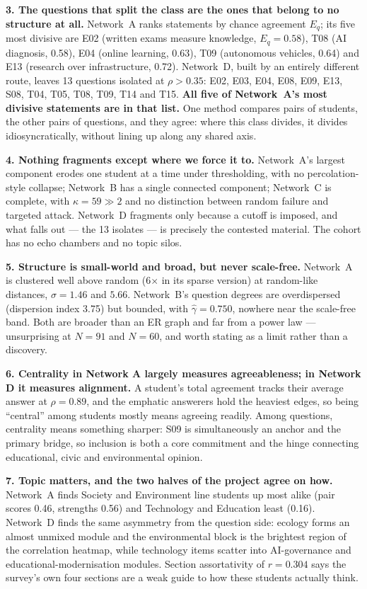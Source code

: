 \documentclass[11pt, a4paper]{article}
\begin{document}
\textbf{3. The questions that split the class are the ones that belong to no structure at all.} Network~A ranks
statements by chance agreement $E_q$; its five most divisive are E02 (written exams measure knowledge,
$E_q = 0.58$), T08 (AI diagnosis, 0.58), E04 (online learning, 0.63), T09 (autonomous vehicles, 0.64) and E13
(research over infrastructure, 0.72). Network~D, built by an entirely different route, leaves 13 questions
isolated at $\rho > 0.35$: E02, E03, E04, E08, E09, E13, S08, T04, T05, T08, T09, T14 and T15. \textbf{All five
of Network~A's most divisive statements are in that list.} One method compares pairs of students, the other
pairs of questions, and they agree: where this class divides, it divides idiosyncratically, without lining up
along any shared axis.

\textbf{4. Nothing fragments except where we force it to.} Network~A's largest component erodes one student at
a time under thresholding, with no percolation-style collapse; Network~B has a single connected component;
Network~C is complete, with $\kappa = 59 \gg 2$ and no distinction between random failure and targeted attack.
Network~D fragments only because a cutoff is imposed, and what falls out --- the 13 isolates --- is precisely the
contested material. The cohort has no echo chambers and no topic silos.

\textbf{5. Structure is small-world and broad, but never scale-free.} Network~A is clustered well above random
(6$\times$ in its sparse version) at random-like distances, $\sigma = 1.46$ and $5.66$. Network~B's question
degrees are overdispersed (dispersion index 3.75) but bounded, with $\hat{\gamma} = 0.750$, nowhere near the
scale-free band. Both are broader than an ER graph and far from a power law --- unsurprising at $N = 91$ and
$N = 60$, and worth stating as a limit rather than a discovery.

\textbf{6. Centrality in Network A largely measures agreeableness; in Network D it measures alignment.} A
student's total agreement tracks their average answer at $\rho = 0.89$, and the emphatic answerers hold the
heaviest edges, so being ``central'' among students mostly means agreeing readily. Among questions, centrality
means something sharper: S09 is simultaneously an anchor and the primary bridge, so inclusion is both a core
commitment and the hinge connecting educational, civic and environmental opinion.

\textbf{7. Topic matters, and the two halves of the project agree on how.} Network~A finds Society and
Environment line students up most alike (pair scores 0.46, strengths 0.56) and Technology and Education least
(0.16). Network~D finds the same asymmetry from the question side: ecology forms an almost unmixed module and
the environmental block is the brightest region of the correlation heatmap, while technology items scatter into
AI-governance and educational-modernisation modules. Section assortativity of $r = 0.304$ says the survey's own
four sections are a weak guide to how these students actually think.
\end{document}
